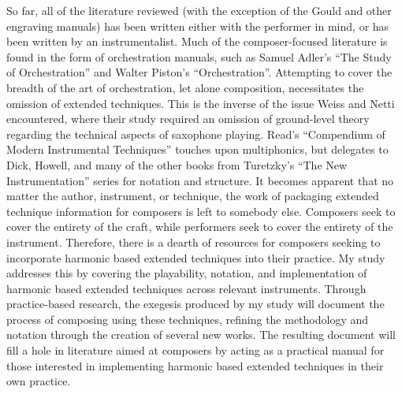 So far, all of the literature reviewed (with the exception of the Gould and other engraving manuals) has been written either with the performer in mind, or has been written by an instrumentalist. Much of the composer-focused literature is found in the form of orchestration manuals, such as Samuel Adler’s “The Study of Orchestration” and Walter Piston’s “Orchestration”.\autocite{adlerStudyOrchestration2002, pistonOrchestration1969}  Attempting to cover the breadth of the art of orchestration, let alone composition, necessitates the omission of extended techniques. This is the inverse of the issue Weiss and Netti encountered, where their study required an omission of ground-level theory regarding the technical aspects of saxophone playing. Read’s “Compendium of Modern Instrumental Techniques” touches upon multiphonics, but delegates to Dick, Howell, and many of the other books from Turetzky’s “The New Instrumentation” series for notation and structure.\autocite[160]{readCompendiumModernInstrumental1993}  It becomes apparent that no matter the author, instrument, or technique, the work of packaging extended technique information for composers is left to somebody else. Composers seek to cover the entirety of the craft, while performers seek to cover the entirety of the instrument. Therefore, there is a dearth of resources for composers seeking to incorporate harmonic based extended techniques into their practice. My study addresses this by covering the playability, notation, and implementation of harmonic based extended techniques across relevant instruments. Through practice-based research, the exegesis produced by my study will document the process of composing using these techniques, refining the methodology and notation through the creation of several new works. The resulting document will fill a hole in literature aimed at composers by acting as a practical manual for those interested in implementing harmonic based extended techniques in their own practice.




